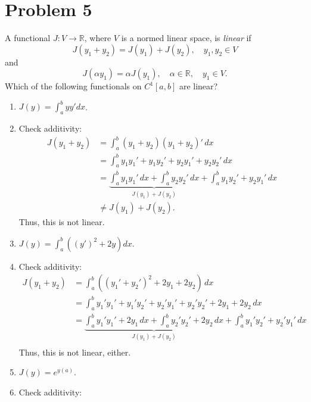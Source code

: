 \documentclass{article}
\begin{document}
\section*{Problem 5}
A functional $J: V \rightarrow \mathbb{R}$, where $V$ is a normed
linear space, is \emph{linear} if 
\begin{equation*}
  J(y_1 + y_2) = J(y_1) + J(y_2), \quad y_1,y_2 \in V
\end{equation*}
and
\begin{equation*}
  J(\alpha y_1) = \alpha J(y_1), \quad \alpha\in \mathbb{R}, \quad y_1
  \in V.
\end{equation*}
Which of the following functionals on $C^1[a,b]$ are linear?
\begin{enumerate}[label={(\alph*)}]
\item $ J(y) = \int_a^b yy' dx$.
\item[] Check additivity:
\begin{equation*}
    \begin{split}
      J(y_1+y_2) &= \int_a^b(y_1 + y_2)(y_1 + y_2)' \, dx \\
      &= \int_a^b y_1y_1' + y_1y_2' + y_2y_1' + y_2y_2' \, dx\\
      &= \underbrace{\int_a^b  y_1y_1'\,dx  + \int_a^b y_2y_2' \,
        dx}_{J(y_1) + J(y_2)} + \int_a^b
      y_1y_2' + y_2y_1'\, dx\\
      & \neq J(y_1) + J(y_2).      
    \end{split}
  \end{equation*}
  Thus, this is not linear.
\item $ J(y) = \int_a^b ((y')^2 + 2y) dx$.
\item[]Check additivity:
  \begin{equation*}
    \begin{split}
      J(y_1 + y_2) &= 
      \int_a^b ((y_1' + y_2')^2 + 2y_1 + 2y_2)\, dx\\
      & = \int_a^b y_1'y_1' + y_1'y_2' + y_2'y_1' + y_2'y_2' + 2y_1 +
      2y_2\, dx\\
      &= \underbrace{\int_a^b  y_1'y_1' + 2y_1\,dx  + \int_a^b
        y_2'y_2'  + 2y_2 \,dx}_{J(y_1) + J(y_2)} + \int_a^b
      y_1'y_2' + y_2'y_1'\, dx\\
    \end{split}
  \end{equation*}
Thus, this is not linear, either.
\item $ J(y) = e^{y(a)}$.
\item[]Check additivity:
  \begin{equation*}

\end{equation*}
\end{enumerate}
\end{document}
